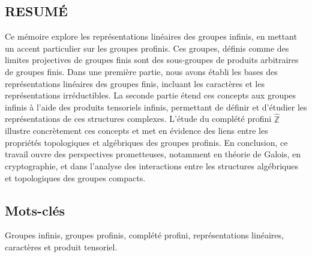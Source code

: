 \documentclass[a4paper, 14pt]{report}
\newcommand{\applyfontsize}{%
	\fontsize{12}{12}\selectfont
}
\begin{document}
\begin{onehalfspace}
		\chapter*{RESUMÉ}
		{
			\applyfontsize %
			Ce mémoire explore les représentations linéaires des groupes infinis, en mettant un accent particulier sur les groupes profinis. Ces groupes, définis comme des limites projectives de groupes finis sont des sous-groupes de produits arbitraires de groupes finis. Dans une première partie, nous avons établi les bases des représentations linéaires des groupes finis, incluant les caractères et les représentations irréductibles. La seconde partie étend ces concepts aux groupes infinis à l’aide des produits tensoriels infinis, permettant de définir et d’étudier les représentations de ces structures complexes. L’étude du complété profini \( \widehat{\mathbb{Z}} \) illustre concrètement ces concepts et met en évidence des liens entre les propriétés topologiques et algébriques des groupes profinis. En conclusion, ce travail ouvre des perspectives prometteuses, notamment en théorie de Galois, en cryptographie, et dans l’analyse des interactions entre les structures algébriques et topologiques des groupes compacts.
			
			
			\section*{Mots-clés}
			Groupes infinis, groupes profinis, complété profini, représentations linéaires, caractères et produit tensoriel.
			
		}
		
		

\end{onehalfspace}
\end{document}
